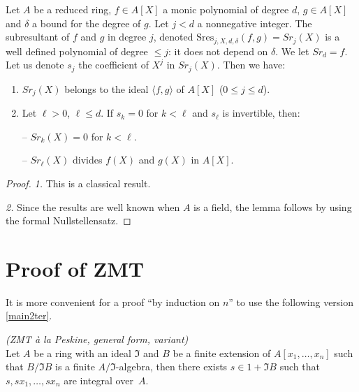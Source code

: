 \documentclass[11pt,a4paper,twoside]{article}
\newcommand{\gothic}{\mathfrak}
\newcommand{\fI}{{\gothic I}}
\newcommand\gen[1]{{\langle #1 \rangle}}
\begin{document}
\medskip {}



\begin{lemma} \label{lemSoures}
Let $A$ be a reduced ring, $f\in A[X]$ a monic polynomial of degree $d$, $g\in A[X]$
and $\delta$ a bound for the degree of $g$.
Let $j<d$ a nonnegative integer. The subresultant of $f$ and $g$ in degree $j$, denoted  $\mathrm{Sres}_{j,X,d,\delta}(f,g)=Sr_{j}(X)$ is a well defined polynomial of degree $\leq j$: it does not depend on $\delta$. We let $Sr_d=f$. Let us denote $s_j$ the coefficient 
of $X^j$ in $Sr_{j}(X)$. Then we have:
%
\begin{enumerate}
%
\item $Sr_{j}(X)$ belongs to the ideal $\gen{f,g}$ of $A[X]$ ($0\leq j\leq d$).
%
\item Let $\ell>0$, $\ell\leq d$. If $s_k=0$ for $k<\ell$ and $s_\ell$ is invertible, then:

\noindent -- $Sr_{k}(X)=0$ for $k<\ell$.


\noindent -- $Sr_{\ell}(X)$ divides $f(X)$ and $g(X)$ in $A[X]$.
%
\end{enumerate}
\end{lemma}
%
\begin{proof} \emph{1.} This is a classical result.

\noindent \emph{2.}
Since the results are well known  when $A$ is a field,
the lemma follows by using the formal Nullstellensatz.
\end{proof}
%








\section{Proof of ZMT} \label{secProofZMT}
\label{subsecThmain2}

It is more convenient for a proof ``by
induction on $n$'' to use the following version \ref{main2ter}. 

\begin{theorem}\label{main2ter}\emph{(ZMT \`a la Peskine, general form, variant)}\\
Let $A$ be a ring with an ideal $\fI$
and $B$ be a finite extension of $A[x_1,\dots,x_n]$ such that 
$B/\fI B$ is a finite $A/\fI$-algebra,  then there exists 
$s\in 1+\fI B$ such that $s,sx_1,\dots,sx_n$ are integral over~$A$.
\end{theorem}
\end{document}
